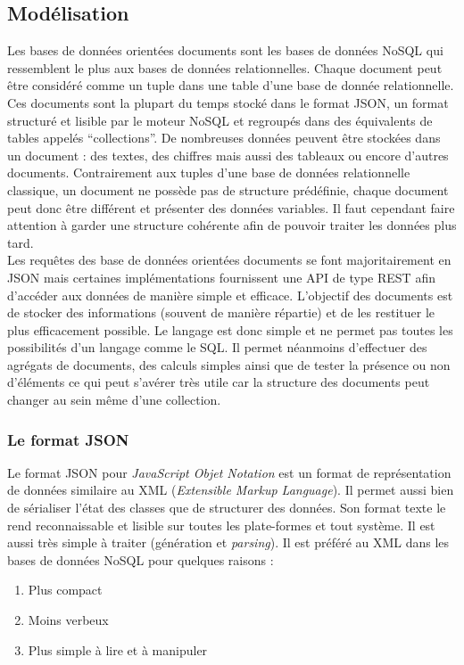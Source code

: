 \subsection{Modélisation}

  Les bases de données orientées documents sont les bases de données NoSQL qui ressemblent le plus aux bases de données relationnelles. Chaque document peut être considéré comme un tuple dans une table d'une base de donnée relationnelle. Ces documents sont la plupart du temps stocké dans le format JSON, un format structuré et lisible par le moteur NoSQL et regroupés dans des équivalents de tables appelés \enquote{collections}. De nombreuses données peuvent être stockées dans un document : des textes, des chiffres mais aussi des tableaux ou encore d'autres documents. Contrairement aux tuples d'une base de données relationnelle classique, un document ne possède pas de structure prédéfinie, chaque document peut donc être différent et présenter des données variables. Il faut cependant faire attention à garder une structure cohérente afin de pouvoir traiter les données plus tard.\\

  Les requêtes des base de données orientées documents se font majoritairement en JSON mais certaines implémentations fournissent une API de type REST afin d’accéder aux données de manière simple et efficace. L'objectif des documents est de stocker des informations (souvent de manière répartie) et de les restituer le plus efficacement possible. Le langage est donc simple et ne permet pas toutes les possibilités d'un langage comme le SQL. Il permet néanmoins d'effectuer des agrégats de documents, des calculs simples ainsi que de tester la présence ou non d'éléments ce qui peut s'avérer très utile car la structure des documents peut changer au sein même d'une collection.

\subsubsection{Le format JSON}

  Le format JSON pour \textit{JavaScript Objet Notation} est un format de représentation de données similaire au XML (\textit{Extensible Markup Language}). Il permet aussi bien de sérialiser l'état des classes que de structurer des données. Son format texte le rend reconnaissable et lisible sur toutes les plate-formes et tout système. Il est aussi très simple à traiter (génération et \textit{parsing}). Il est préféré au XML dans les bases de données NoSQL pour quelques raisons :
  \vspace{10px}
  \begin{enumerate}
    \item Plus compact
    \item Moins verbeux
    \item Plus simple à lire et à manipuler
  \end{enumerate}

